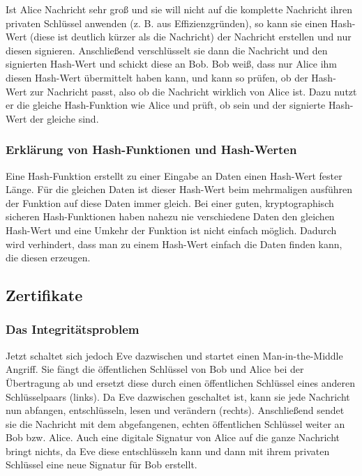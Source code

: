 Ist Alice Nachricht sehr groß und sie will nicht auf die komplette Nachricht
ihren privaten Schlüssel anwenden (z. B. aus Effizienzgründen), so kann sie
einen Hash-Wert (diese ist deutlich kürzer als die Nachricht) der Nachricht erstellen
und nur diesen signieren. Anschließend verschlüsselt sie dann die Nachricht und
den signierten Hash-Wert und schickt diese an Bob.
Bob weiß, dass nur Alice ihm diesen Hash-Wert übermittelt haben kann, und kann so
prüfen, ob der Hash-Wert zur Nachricht passt, also ob die Nachricht wirklich von Alice
ist. Dazu nutzt er die gleiche Hash-Funktion wie Alice und prüft, ob sein und der signierte
Hash-Wert der gleiche sind.

\subsubsection{Erklärung von Hash-Funktionen und Hash-Werten}

Eine Hash-Funktion erstellt zu einer Eingabe an Daten einen Hash-Wert fester Länge.
Für die gleichen Daten ist dieser Hash-Wert beim mehrmaligen ausführen der 
Funktion auf diese Daten immer gleich.
Bei einer guten, kryptographisch sicheren Hash-Funktionen haben nahezu nie verschiedene
Daten den gleichen Hash-Wert und eine Umkehr der Funktion ist nicht einfach möglich.
Dadurch wird verhindert, dass man zu einem Hash-Wert einfach die Daten finden kann, die
diesen erzeugen.

\subsection{Zertifikate}

\subsubsection{Das Integritätsproblem}

Jetzt schaltet sich jedoch Eve dazwischen und startet einen Man-in-the-Middle Angriff.
Sie fängt die öffentlichen Schlüssel von Bob und Alice bei der Übertragung
ab und ersetzt diese durch einen öffentlichen Schlüssel eines anderen Schlüsselpaars (links).
Da Eve dazwischen geschaltet ist, kann sie jede Nachricht nun abfangen, entschlüsseln, lesen
und verändern (rechts). Anschließend sendet sie die Nachricht mit dem abgefangenen, echten öffentlichen
Schlüssel weiter an Bob bzw. Alice. Auch eine digitale Signatur von Alice auf die ganze Nachricht bringt nichts,
da Eve diese entschlüsseln kann und dann mit ihrem privaten Schlüssel eine neue
Signatur für Bob erstellt.

